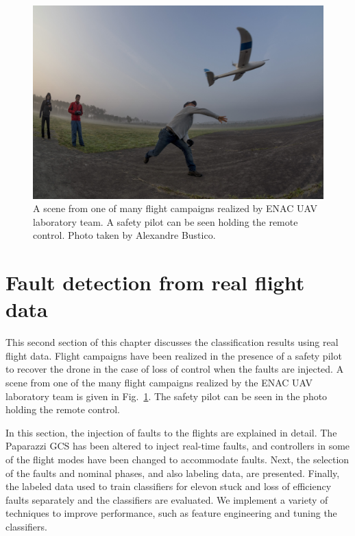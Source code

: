 \begin{figure}
\begin{center}
\includegraphics[width=1\textwidth]{figures/flightCampaign}    %
\caption{A scene from one of many flight campaigns realized by ENAC UAV laboratory team. A safety pilot can be seen holding the remote control. Photo taken by Alexandre Bustico.} 
\label{fig:flightCampaign}
\end{center}
\end{figure}

\section{Fault detection from real flight data}

This second section of this chapter discusses the classification results using real flight data. 
Flight campaigns have been realized in the presence of a safety pilot to recover the drone in the case of loss of control when the faults are injected. 
A scene from one of the many flight campaigns realized by the ENAC UAV laboratory team is given in Fig.~\ref{fig:flightCampaign}. 
The safety pilot can be seen in the photo holding the remote control.

In this section, the injection of faults to the flights are explained in detail. 
The Paparazzi GCS has been altered to inject real-time faults, and controllers in some of the flight modes have been changed to accommodate faults. 
Next, the selection of the faults and nominal phases, and also labeling data, are presented. 
Finally, the labeled data used to train classifiers for elevon stuck and loss of efficiency faults separately and the classifiers are evaluated. 
We implement a variety of techniques to improve performance, such as feature engineering and tuning the classifiers. 

